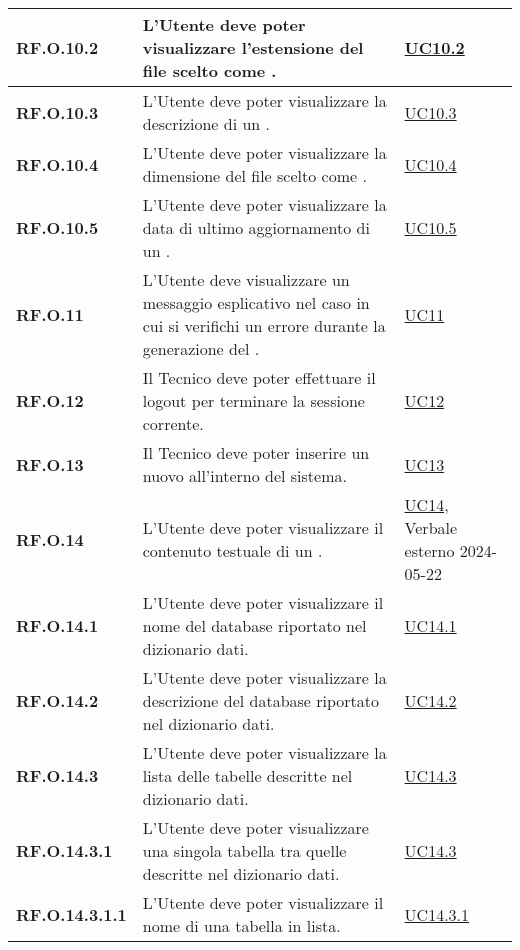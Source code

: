 \begin{adjustwidth}{-0.5cm}{-0.5cm}
\begin{longtable}{|P{3cm}|P{6,5cm}|>{\arraybackslash}P{4cm}|}
    \hline
    \textbf{RF.O.10.2} & L'Utente deve poter visualizzare l'estensione del file scelto come . & \hyperref[UC10point2]{UC10.2}\\
    \hline
    \textbf{RF.O.10.3} & L'Utente deve poter visualizzare la descrizione di un . & \hyperref[UC10point3]{UC10.3}\\
    \hline
    \textbf{RF.O.10.4} & L'Utente deve poter visualizzare la dimensione del file scelto come . & \hyperref[UC10point4]{UC10.4}\\
    \hline
    \textbf{RF.O.10.5} & L'Utente deve poter visualizzare la data di ultimo aggiornamento di un . & \hyperref[UC10point5]{UC10.5}\\
    \hline
    \textbf{RF.O.11} & L'Utente deve visualizzare un messaggio esplicativo nel caso in cui si verifichi un errore durante la generazione del . & \hyperref[UC11]{UC11}\\
    \hline
    \textbf{RF.O.12} & Il Tecnico deve poter effettuare il logout per terminare la sessione corrente. & \hyperref[UC12]{UC12}\\
    \hline
    \textbf{RF.O.13} & Il Tecnico deve poter inserire un nuovo  all'interno del sistema. & \hyperref[UC13]{UC13}\\
    \hline
    \textbf{RF.O.14} & L'Utente deve poter visualizzare il contenuto testuale di un . & \hyperref[UC14]{UC14}, Verbale esterno 2024-05-22\\
    \hline
    \textbf{RF.O.14.1} & L'Utente deve poter visualizzare il nome del database riportato nel dizionario dati. & \hyperref[UC14point1]{UC14.1}\\
    \hline
    \textbf{RF.O.14.2} & L'Utente deve poter visualizzare la descrizione del database riportato nel dizionario dati. & \hyperref[UC14point2]{UC14.2}\\
    \hline
    \textbf{RF.O.14.3} & L'Utente deve poter visualizzare la lista delle tabelle descritte nel dizionario dati. & \hyperref[UC14point3]{UC14.3}\\
    \hline
    \textbf{RF.O.14.3.1} & L'Utente deve poter visualizzare una singola tabella tra quelle descritte nel dizionario dati. & \hyperref[UC14point3]{UC14.3}\\
    \hline
    \textbf{RF.O.14.3.1.1} & L'Utente deve poter visualizzare il nome di una tabella in lista. & \hyperref[UC14point3point1]{UC14.3.1}\\

\end{longtable}
\end{adjustwidth}
